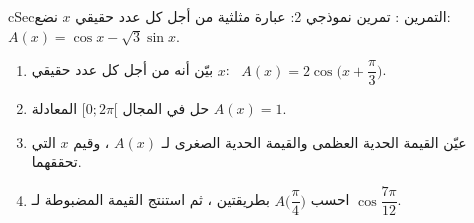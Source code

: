 \documentclass[12pt,a4paper]{article}
\newenvironment{BOX}[2]{\begin{otherlanguage}{english}\begin{arbox}{#1}{#2}}{\end{arbox}\end{otherlanguage}}
\newcounter{exo}
\newenvironment{tamrin}[1]{\stepcounter{exo}\begin{BOX}{cSec}{التمرين \theexo: #1}}{\end{BOX}}
\begin{document}
\begin{tamrin}{تمرين نموذجي 2: عبارة مثلثية}
من أجل كل عدد حقيقي $x$ نضع: $A(x)=\cos x-\sqrt3\sin x$.
\begin{enumerate}
\item بيّن أنه من أجل كل عدد حقيقي $x$: \ $A(x)=2\cos\Big(x+\dfrac\pi3\Big)$.
\item حل في المجال $[0;2\pi[$ المعادلة $A(x)=1$.
\item عيّن القيمة الحدية العظمى والقيمة الحدية الصغرى لـ $A(x)$ ، وقيم $x$ التي تحققهما.
\item احسب $A\Big(\dfrac\pi4\Big)$ بطريقتين ، ثم استنتج القيمة المضبوطة لـ $\cos\dfrac{7\pi}{12}$.
\end{enumerate}
\end{tamrin}
\end{document}
